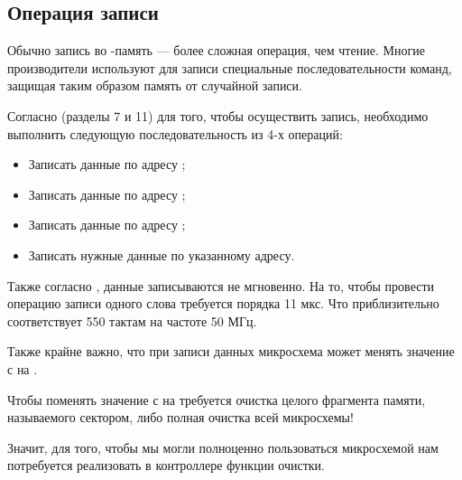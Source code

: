 \subsection{Операция записи}
\par{Обычно запись во -память --- более сложная операция, чем чтение. Многие производители используют для записи специальные последовательности команд, защищая таким образом память от случайной записи.}
\par{Согласно  (разделы 7 и 11) для того, чтобы осуществить запись, необходимо выполнить следующую последовательность из 4-х операций:
\begin{itemize}[noitemsep, label={}]
  \item Записать данные  по адресу ;
  \item Записать данные  по адресу ;
  \item Записать данные  по адресу ;
  \item Записать нужные данные по указанному адресу.
\end{itemize}
}
\par{Также согласно , данные записываются не мгновенно. На то, чтобы провести операцию записи одного слова требуется порядка 11 мкс. Что приблизительно соответствует 550 тактам на частоте 50 МГц.}
\par{Также крайне важно, что при записи данных микросхема  может менять значение с  на .}
\par{Чтобы поменять значение с  на  требуется очистка целого фрагмента памяти, называемого сектором, либо полная очистка всей микросхемы!}
\par{Значит, для того, чтобы мы могли полноценно пользоваться микросхемой  нам потребуется реализовать в контроллере функции очистки.}

